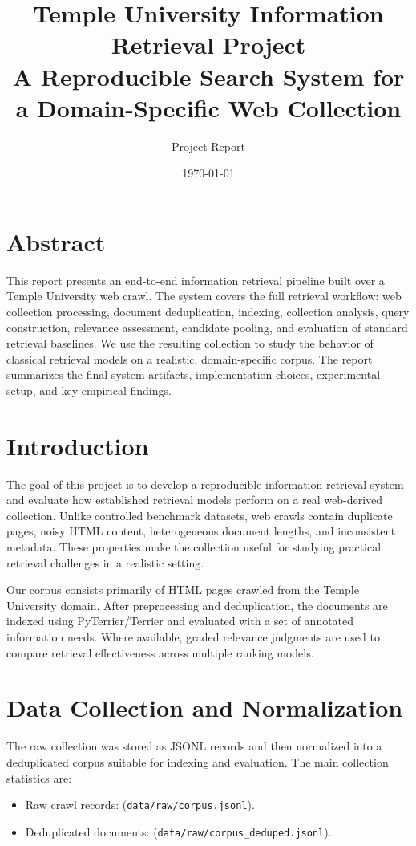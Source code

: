 \documentclass[11pt,a4paper]{article}
\title{Temple University Information Retrieval Project\\
A Reproducible Search System for a Domain-Specific Web Collection}
\author{Project Report}
\date{\today}
\begin{document}
\sloppy
\maketitle
\tableofcontents
\bigskip

\section{Abstract}
This report presents an end-to-end information retrieval pipeline built over a Temple University web crawl. The system covers the full retrieval workflow: web collection processing, document deduplication, indexing, collection analysis, query construction, relevance assessment, candidate pooling, and evaluation of standard retrieval baselines. We use the resulting collection to study the behavior of classical retrieval models on a realistic, domain-specific corpus. The report summarizes the final system artifacts, implementation choices, experimental setup, and key empirical findings.

\section{Introduction}
The goal of this project is to develop a reproducible information retrieval system and evaluate how established retrieval models perform on a real web-derived collection. Unlike controlled benchmark datasets, web crawls contain duplicate pages, noisy HTML content, heterogeneous document lengths, and inconsistent metadata. These properties make the collection useful for studying practical retrieval challenges in a realistic setting.

Our corpus consists primarily of HTML pages crawled from the Temple University domain. After preprocessing and deduplication, the documents are indexed using PyTerrier/Terrier and evaluated with a set of annotated information needs. Where available, graded relevance judgments are used to compare retrieval effectiveness across multiple ranking models.

\section{Data Collection and Normalization}
The raw collection was stored as JSONL records and then normalized into a deduplicated corpus suitable for indexing and evaluation. The main collection statistics are:
\begin{itemize}
  \item Raw crawl records: \textbf{\RawCorpusLines} (\texttt{data/raw/corpus.jsonl}).
  \item Deduplicated documents: \textbf{\DedupDocs} (\texttt{data/raw/corpus\_deduped.jsonl}).
\end{itemize}
\end{document}
